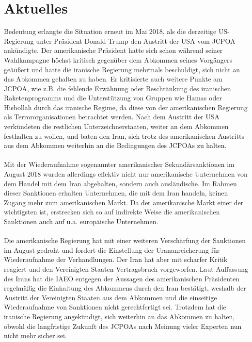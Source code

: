 \documentclass[a4paper,11pt]{article}
\begin{document}
    \section{Aktuelles}
  Bedeutung erlangte die Situation erneut im Mai 2018, als die derzeitige US-Regierung unter Präsident Donald Trump den Austritt der USA vom JCPOA ankündigte. Der amerikanische Präsident hatte sich schon während seiner Wahlkampagne höchst kritisch gegenüber dem Abkommen seines Vorgängers geäußert und hatte die iranische Regierung mehrmals beschuldigt, sich nicht an das Abkommen gehalten zu haben. Er kritisierte auch weitere Punkte am JCPOA, wie z.B. die fehlende Erwähnung oder Beschränkung des iranischen Raketenprogramms und die Unterstützung von Gruppen wie Hamas oder Hisbollah durch das iranische Regime, da diese von der amerikanischen Regierung als Terrororganisationen betrachtet werden. Nach dem Austritt der USA verkündeten die restlichen Unterzeichnerstaaten, weiter an dem Abkommen festhalten zu wollen, und baten den Iran, sich trotz des amerikanischen Austritts aus dem Abkommen weiterhin an die Bedingungen des JCPOAs zu halten.
\\ \\
Mit der Wiederaufnahme sogenannter amerikanischer Sekundärsanktionen im August 2018 wurden allerdings effektiv nicht nur amerikanische Unternehmen von dem Handel mit dem Iran abgehalten, sondern auch ausländische. Im Rahmen dieser Sanktionen erhalten Unternehmen, die mit dem Iran handeln, keinen Zugang mehr zum amerikanischen Markt. Da der amerikanische Markt einer der wichtigsten ist, erstrecken sich so auf indirekte Weise die amerikanischen Sanktionen auch auf u.a. europäische Unternehmen.
\\ \\
Die amerikanische Regierung hat mit einer weiteren Verschärfung der Sanktionen im August gedroht und fordert die Einstellung der Urananreicherung für Wiederaufnahme der Verhandlungen. Der Iran hat aber mit scharfer Kritik reagiert und den Vereinigten Staaten Vertragsbruch vorgeworfen. Laut Auffassung des Irans hat die IAEO entgegen der Aussagen des amerikanischen Präsidenten regelmäßig die Einhaltung des Abkommens durch den Iran bestätigt, weshalb der Austritt der Vereinigten Staaten aus dem Abkommen und die einseitige Wiederaufnahme von Sanktionen nicht gerechtfertigt sei. Trotzdem hat die iranische Regierung angekündigt, sich weiterhin an das Abkommen zu halten, obwohl die langfristige Zukunft des JCPOAs nach Meinung vieler Experten nun nicht mehr sicher sei.
\end{document}
